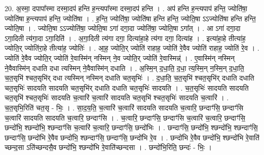 \documentclass[17pt]{extarticle}
\begin{document}
20. अ॒स्मा॒ दपापा᳚स्मा दस्मा॒दप॑ हन्ति ह॒न्त्यपा᳚स्मा दस्मा॒दप॑ हन्ति । . अप॑ हन्ति ह॒न्त्यपाप॑ हन्ति॒ ज्योति॑षा॒ ज्योति॑षा ह॒न्त्यपाप॑ हन्ति॒ ज्योति॑षा । . ह॒न्ति॒ ज्योति॑षा॒ ज्योति॑षा हन्ति हन्ति॒ ज्योति॒षा ऽऽज्योति॑षा हन्ति हन्ति॒ ज्योति॒षा । . ज्योति॒षा ऽऽज्योति॑षा॒ ज्योति॒षा ऽगा॑ दगा॒दा ज्योति॑षा॒ ज्योति॒षा ऽगा᳚त् । . आ ऽगा॑ दगा॒दा ऽगा॒दिती त्य॑गा॒दा ऽगा॒दिति॑ । . अ॒गा॒दिती त्य॑गा दगा॒ दित्या॑हा॒हे त्य॑गा दगा॒ दित्या॑ह । . इत्या॑हा॒हे तीत्या॑ह॒ ज्योति॒र् ज्योति॑रा॒हे तीत्या॑ह॒ ज्योतिः॑ । . आ॒ह॒ ज्योति॒र् ज्योति॑ राहाह॒ ज्योति॑ रे॒वैव ज्योति॑ राहाह॒ ज्योति॑ रे॒व । . ज्योति॑ रे॒वैव ज्योति॒र् ज्योति॑ रे॒वास्मि॑न् नस्मिन् ने॒व ज्योति॒र् ज्योति॑ रे॒वास्मिन्न्॑ । . ए॒वास्मि॑न् नस्मिन् ने॒वैवास्मि॑न् दधाति दधा त्यस्मिन् ने॒वैवास्मि॑न् दधाति । . अ॒स्मि॒न् द॒धा॒ति॒ द॒धा॒ त्य॒स्मि॒न् न॒स्मि॒न् द॒धा॒ति॒ च॒त॒सृभि॑ श्चत॒सृभि॑र् दधा त्यस्मिन् नस्मिन् दधाति चत॒सृभिः॑ । . द॒धा॒ति॒ च॒त॒सृभि॑ श्चत॒सृभि॑र् दधाति दधाति चत॒सृभिः॑ सादयति सादयति चत॒सृभि॑र् दधाति दधाति चत॒सृभिः॑ सादयति । . च॒त॒सृभिः॑ सादयति सादयति चत॒सृभि॑ श्चत॒सृभिः॑ सादयति च॒त्वारि॑ च॒त्वारि॑ सादयति चत॒सृभि॑ श्चत॒सृभिः॑ सादयति च॒त्वारि॑ । . च॒त॒सृभि॒रिति॑ चत॒सृ - भिः॒ । . सा॒द॒य॒ति॒ च॒त्वारि॑ च॒त्वारि॑ सादयति सादयति च॒त्वारि॒ छन्दाꣳ॑सि॒ छन्दाꣳ॑सि च॒त्वारि॑ सादयति सादयति च॒त्वारि॒ छन्दाꣳ॑सि । . च॒त्वारि॒ छन्दाꣳ॑सि॒ छन्दाꣳ॑सि च॒त्वारि॑ च॒त्वारि॒ छन्दाꣳ॑सि॒ छन्दो॑भि॒ श्छन्दो॑भि॒ श्छन्दाꣳ॑सि च॒त्वारि॑ च॒त्वारि॒ छन्दाꣳ॑सि॒ छन्दो॑भिः । . छन्दाꣳ॑सि॒ छन्दो॑भि॒ श्छन्दो॑भि॒ श्छन्दाꣳ॑सि॒ छन्दाꣳ॑सि॒ छन्दो॑भि रे॒वैव छन्दो॑भि॒ श्छन्दाꣳ॑सि॒ छन्दाꣳ॑सि॒ छन्दो॑भि रे॒व । . छन्दो॑भि रे॒वैव छन्दो॑भि॒ श्छन्दो॑भि रे॒वाति॑ च्छन्द॒सा ऽति॑च्छन्दसै॒व छन्दो॑भि॒ श्छन्दो॑भि रे॒वाति॑च्छन्दसा । . छन्दो॑भि॒रिति॒ छन्दः॑ - भिः॒ । \newline
\end{document}
